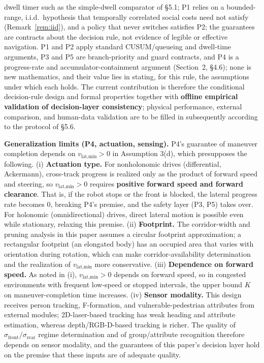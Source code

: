 \documentclass[11pt]{article}
\begin{document}
dwell timer such as the simple-dwell comparator of \S5.1; P1 relies on a bounded-range, i.i.d.\ hypothesis that temporally correlated social costs need not satisfy (Remark~\ref{rem:iid}), and a policy that never switches satisfies P2; the guarantees are contracts about the decision rule, not evidence of legible or effective navigation. P1 and P2 apply standard CUSUM/queueing and dwell-time arguments, P3 and P5 are branch-priority and guard contracts, and P4 is a progress-rate and accumulator-containment argument (Section~2, \S4.6); none is new mathematics, and their value lies in stating, for this rule, the assumptions under which each holds. The current contribution is therefore the conditional decision-rule design and formal properties together with \textbf{offline empirical validation of decision-layer consistency}; physical performance, external comparison, and human-data validation are to be filled in subsequently according to the protocol of \S5.6.

\textbf{Generalization limits (P4, actuation, sensing).} P4's guarantee of maneuver completion depends on $v_{\text{lat,min}} > 0$ in Assumption 3(d), which presupposes the following. (i) \textbf{Actuation type.} For nonholonomic drives (differential, Ackermann), cross-track progress is realized only as the product of forward speed and steering, so $v_{\text{lat,min}} > 0$ requires \textbf{positive forward speed and forward clearance}. That is, if the robot stops or the front is blocked, the lateral progress rate becomes 0, breaking P4's premise, and the safety layer (P3, P5) takes over. For holonomic (omnidirectional) drives, direct lateral motion is possible even while stationary, relaxing this premise. (ii) \textbf{Footprint.} The corridor-width and pruning analysis in this paper assumes a circular footprint approximation; a rectangular footprint (an elongated body) has an occupied area that varies with orientation during rotation, which can make corridor-availability determination and the realization of $v_{\text{lat,min}}$ more conservative. (iii) \textbf{Dependence on forward speed.} As noted in (i), $v_{\text{lat,min}} > 0$ depends on forward speed, so in congested environments with frequent low-speed or stopped intervals, the upper bound $K$ on maneuver-completion time increases. (iv) \textbf{Sensor modality.} This design receives person tracking, F-formation, and vulnerable-pedestrian attributes from external modules; 2D-laser-based tracking has weak heading and attribute estimation, whereas depth/RGB-D-based tracking is richer. The quality of $\sigma_{\text{front}}/\sigma_{\text{rear}}$ regime determination and of group/attribute recognition therefore depends on sensor modality, and the guarantees of this paper's decision layer hold on the premise that these inputs are of adequate quality.
\end{document}
